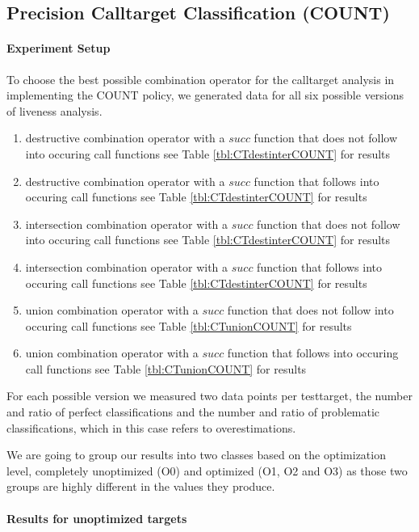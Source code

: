 \subsection{Precision Calltarget Classification (COUNT)}
\label{subsection:typeshieldprecision}

\paragraph{Experiment Setup}
To choose the best possible combination operator for the calltarget analysis in implementing the COUNT policy, we generated data for all six possible versions of liveness analysis.
\begin{enumerate}
\item destructive combination operator with a $succ$ function that does not follow into occuring call functions see Table \ref{tbl:CTdestinterCOUNT} for results
\item destructive combination operator with a $succ$ function that follows into occuring call functions see Table \ref{tbl:CTdestinterCOUNT} for results
\item intersection combination operator with a $succ$ function that does not follow into occuring call functions see Table \ref{tbl:CTdestinterCOUNT} for results
\item intersection combination operator with a $succ$ function that follows into occuring call functions see Table \ref{tbl:CTdestinterCOUNT} for results
\item union combination operator with a $succ$ function that does not follow into occuring call functions see Table \ref{tbl:CTunionCOUNT} for results
\item union combination operator with a $succ$ function that follows into occuring call functions see Table \ref{tbl:CTunionCOUNT} for results
\end{enumerate}
For each possible version we measured two data points per testtarget, the number and ratio of perfect classifications and the number and ratio of problematic classifications, which in this case refers to overestimations.

We are going to group our results into two classes based on the optimization level, completely unoptimized (O0) and optimized (O1, O2 and O3) as those two groups are highly different in the values they produce.

\paragraph{Results for unoptimized targets}

